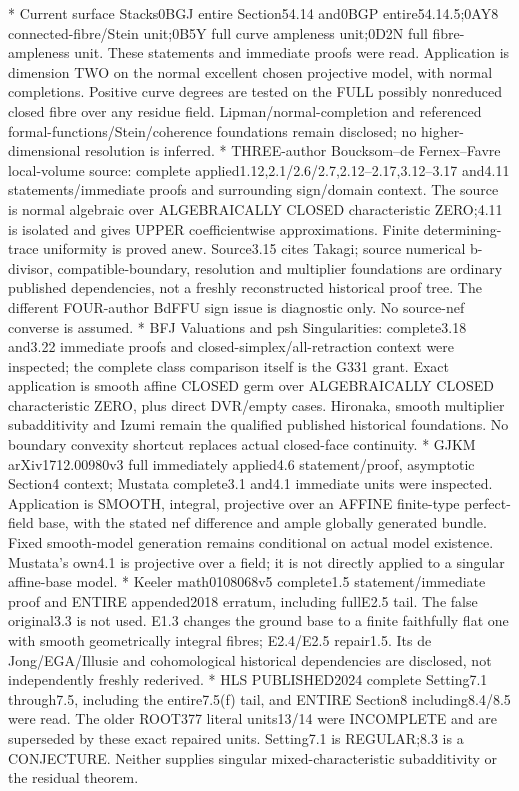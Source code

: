 \documentclass[11pt]{article}
\begin{document}
\begin{ImportedQualifiedGrant}
* Current surface Stacks0BGJ entire Section54.14 and0BGP entire54.14.5;0AY8 connected-fibre/Stein unit;0B5Y full curve ampleness unit;0D2N full fibre-ampleness unit. These statements and immediate proofs were read. Application is dimension TWO on the normal excellent chosen projective model, with normal completions. Positive curve degrees are tested on the FULL possibly nonreduced closed fibre over any residue field. Lipman/normal-completion and referenced formal-functions/Stein/coherence foundations remain disclosed; no higher-dimensional resolution is inferred.
* THREE-author Boucksom--de Fernex--Favre local-volume source: complete applied1.12,2.1/2.6/2.7,2.12--2.17,3.12--3.17 and4.11 statements/immediate proofs and surrounding sign/domain context. The source is normal algebraic over ALGEBRAICALLY CLOSED characteristic ZERO;4.11 is isolated and gives UPPER coefficientwise approximations. Finite determining-trace uniformity is proved anew. Source3.15 cites Takagi; source numerical b-divisor, compatible-boundary, resolution and multiplier foundations are ordinary published dependencies, not a freshly reconstructed historical proof tree. The different FOUR-author BdFFU sign issue is diagnostic only. No source-nef converse is assumed.
* BFJ Valuations and psh Singularities: complete3.18 and3.22 immediate proofs and closed-simplex/all-retraction context were inspected; the complete class comparison itself is the G331 grant. Exact application is smooth affine CLOSED germ over ALGEBRAICALLY CLOSED characteristic ZERO, plus direct DVR/empty cases. Hironaka, smooth multiplier subadditivity and Izumi remain the qualified published historical foundations. No boundary convexity shortcut replaces actual closed-face continuity.
* GJKM arXiv1712.00980v3 full immediately applied4.6 statement/proof, asymptotic Section4 context; Mustata complete3.1 and4.1 immediate units were inspected. Application is SMOOTH, integral, projective over an AFFINE finite-type perfect-field base, with the stated nef difference and ample globally generated bundle. Fixed smooth-model generation remains conditional on actual model existence. Mustata's own4.1 is projective over a field; it is not directly applied to a singular affine-base model.
* Keeler math0108068v5 complete1.5 statement/immediate proof and ENTIRE appended2018 erratum, including fullE2.5 tail. The false original3.3 is not used. E1.3 changes the ground base to a finite faithfully flat one with smooth geometrically integral fibres; E2.4/E2.5 repair1.5. Its de Jong/EGA/Illusie and cohomological historical dependencies are disclosed, not independently freshly rederived.
* HLS PUBLISHED2024 complete Setting7.1 through7.5, including the entire7.5(f) tail, and ENTIRE Section8 including8.4/8.5 were read. The older ROOT377 literal units13/14 were INCOMPLETE and are superseded by these exact repaired units. Setting7.1 is REGULAR;8.3 is a CONJECTURE. Neither supplies singular mixed-characteristic subadditivity or the residual theorem.


\end{ImportedQualifiedGrant}
\end{document}
